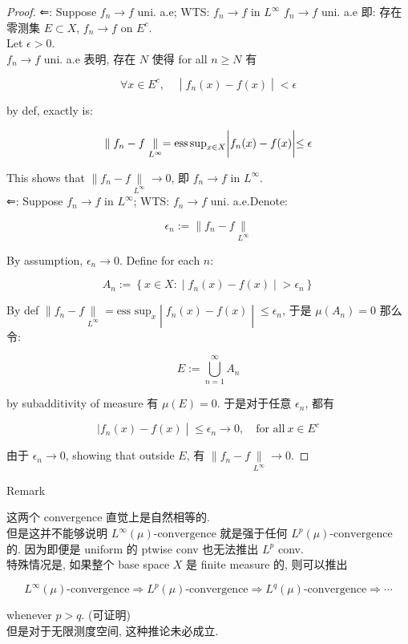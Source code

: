 \documentclass{qlnotes-export}
\begin{document}
\begin{proof}

⇐: Suppose \(f_{n}\rightarrow f\) uni. a.e; WTS: \(f_{n}\rightarrow f\) in \(L^{\infty}\) \(f_{n}\rightarrow f\) uni. a.e 即: 存在零测集 \(E \subset X\), \(f_{n}\rightarrow f\) on \(E^{c}\).\\
Let \(\epsilon > 0\).\\
\(f_{n}\rightarrow f\) uni. a.e 表明, 存在 \(N\) 使得 for all \(n \geq N\) 有

\[\left. \forall x \in E^{c},\quad \middle| f_{n}(x) - f(x) \middle| < \epsilon \right.\]

by def, exactly is:

\[\left. \parallel f_{n} - f\underset{L^{\infty}}{\parallel} = \text{ess\,sup}_{x \in X} \middle| f_{n}(x) - f(x) \middle| \leq \epsilon \right.\]

This shows that \(\parallel f_{n} - f\underset{L^{\infty}}{\parallel}\rightarrow 0\), 即 \(f_{n}\rightarrow f\) in \(L^{\infty}\).\\
⇐: Suppose \(f_{n}\rightarrow f\) in \(L^{\infty}\); WTS: \(f_{n}\rightarrow f\) uni. a.e.Denote:

\[\epsilon_{n} := \parallel f_{n} - f\underset{L^{\infty}}{\parallel}\]

By assumption, \(\epsilon_{n}\rightarrow 0\). Define for each \(n\):

\[A_{n} := \left\{ x \in X: \middle| f_{n}(x) - f(x) \middle| > \epsilon_{n} \right\}\]

By def \(\left. \parallel f_{n} - f\underset{L^{\infty}}{\parallel} = \text{ess sup}_{x} \middle| f_{n}(x) - f(x) \middle| \leq \epsilon_{n} \right.\), 于是 \(\mu(A_{n}) = 0\) 那么令:

\[E := \bigcup\limits_{n = 1}^{\infty}A_{n}\]

by subadditivity of measure 有 \(\mu(E) = 0\). 于是对于任意 \(\epsilon_{n}\), 都有

\[\left. |f_{n}(x) - f(x) \middle| \leq \epsilon_{n}\rightarrow 0,\quad\text{for all}\ x \in E^{c} \right.\]

由于 \(\epsilon_{n}\rightarrow 0\), showing that outside \(E\), 有 \(\parallel f_{n} - f\underset{L^{\infty}}{\parallel}\rightarrow 0\).

\end{proof}

\begin{qlremark}{Remark}

这两个 convergence 直觉上是自然相等的.\\
但是这并不能够说明 \(L^{\infty}(\mu)\text{-convergence}\) 就是强于任何 \(L^{p}(\mu)\text{-convergence}\) 的. 因为即便是 uniform 的 ptwise conv 也无法推出 \(L^{p}\) conv.\\
特殊情况是, 如果整个 base space \(X\) 是 finite measure 的, 则可以推出

\[L^{\infty}(\mu)\text{-convergence}\Longrightarrow L^{p}(\mu)\text{-convergence}\Longrightarrow L^{q}(\mu)\text{-convergence}\Longrightarrow\cdots\]

whenever \(p > q\). (可证明)\\
但是对于无限测度空间, 这种推论未必成立.

\end{qlremark}
\end{document}
